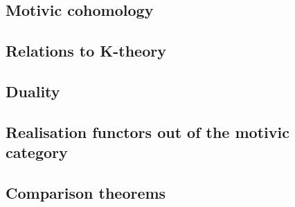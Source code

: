         \subsection{Motivic cohomology}
        
        \subsection{Relations to K-theory}
        
        \subsection{Duality}
        
        \subsection{Realisation functors out of the motivic category}
        
        \subsection{Comparison theorems}
        
    